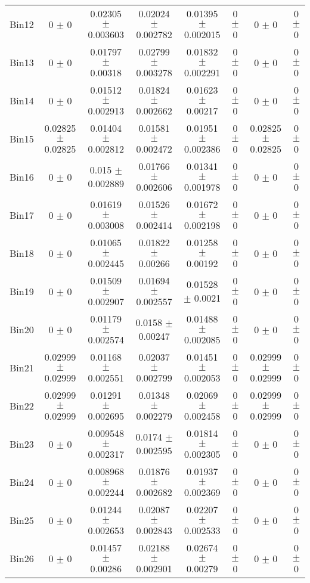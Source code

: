 \begin{tabular}{@{\extracolsep{4pt}}lccccccc@{}}
     Bin12 & 0 $\pm$ 0 & 0.02305 $\pm$ 0.003603 & 0.02024 $\pm$ 0.002782 & 0.01395 $\pm$ 0.002015 & 0 $\pm$ 0 & 0 $\pm$ 0 & 0 $\pm$ 0 \\ 
     Bin13 & 0 $\pm$ 0 & 0.01797 $\pm$ 0.00318 & 0.02799 $\pm$ 0.003278 & 0.01832 $\pm$ 0.002291 & 0 $\pm$ 0 & 0 $\pm$ 0 & 0 $\pm$ 0 \\ 
     Bin14 & 0 $\pm$ 0 & 0.01512 $\pm$ 0.002913 & 0.01824 $\pm$ 0.002662 & 0.01623 $\pm$ 0.00217 & 0 $\pm$ 0 & 0 $\pm$ 0 & 0 $\pm$ 0 \\ 
     Bin15 & 0.02825 $\pm$ 0.02825 & 0.01404 $\pm$ 0.002812 & 0.01581 $\pm$ 0.002472 & 0.01951 $\pm$ 0.002386 & 0 $\pm$ 0 & 0.02825 $\pm$ 0.02825 & 0 $\pm$ 0 \\ 
     Bin16 & 0 $\pm$ 0 & 0.015 $\pm$ 0.002889 & 0.01766 $\pm$ 0.002606 & 0.01341 $\pm$ 0.001978 & 0 $\pm$ 0 & 0 $\pm$ 0 & 0 $\pm$ 0 \\ 
     Bin17 & 0 $\pm$ 0 & 0.01619 $\pm$ 0.003008 & 0.01526 $\pm$ 0.002414 & 0.01672 $\pm$ 0.002198 & 0 $\pm$ 0 & 0 $\pm$ 0 & 0 $\pm$ 0 \\ 
     Bin18 & 0 $\pm$ 0 & 0.01065 $\pm$ 0.002445 & 0.01822 $\pm$ 0.00266 & 0.01258 $\pm$ 0.00192 & 0 $\pm$ 0 & 0 $\pm$ 0 & 0 $\pm$ 0 \\ 
     Bin19 & 0 $\pm$ 0 & 0.01509 $\pm$ 0.002907 & 0.01694 $\pm$ 0.002557 & 0.01528 $\pm$ 0.0021 & 0 $\pm$ 0 & 0 $\pm$ 0 & 0 $\pm$ 0 \\ 
     Bin20 & 0 $\pm$ 0 & 0.01179 $\pm$ 0.002574 & 0.0158 $\pm$ 0.00247 & 0.01488 $\pm$ 0.002085 & 0 $\pm$ 0 & 0 $\pm$ 0 & 0 $\pm$ 0 \\ 
     Bin21 & 0.02999 $\pm$ 0.02999 & 0.01168 $\pm$ 0.002551 & 0.02037 $\pm$ 0.002799 & 0.01451 $\pm$ 0.002053 & 0 $\pm$ 0 & 0.02999 $\pm$ 0.02999 & 0 $\pm$ 0 \\ 
     Bin22 & 0.02999 $\pm$ 0.02999 & 0.01291 $\pm$ 0.002695 & 0.01348 $\pm$ 0.002279 & 0.02069 $\pm$ 0.002458 & 0 $\pm$ 0 & 0.02999 $\pm$ 0.02999 & 0 $\pm$ 0 \\ 
     Bin23 & 0 $\pm$ 0 & 0.009548 $\pm$ 0.002317 & 0.0174 $\pm$ 0.002595 & 0.01814 $\pm$ 0.002305 & 0 $\pm$ 0 & 0 $\pm$ 0 & 0 $\pm$ 0 \\ 
     Bin24 & 0 $\pm$ 0 & 0.008968 $\pm$ 0.002244 & 0.01876 $\pm$ 0.002682 & 0.01937 $\pm$ 0.002369 & 0 $\pm$ 0 & 0 $\pm$ 0 & 0 $\pm$ 0 \\ 
     Bin25 & 0 $\pm$ 0 & 0.01244 $\pm$ 0.002653 & 0.02087 $\pm$ 0.002843 & 0.02207 $\pm$ 0.002533 & 0 $\pm$ 0 & 0 $\pm$ 0 & 0 $\pm$ 0 \\ 
     Bin26 & 0 $\pm$ 0 & 0.01457 $\pm$ 0.00286 & 0.02188 $\pm$ 0.002901 & 0.02674 $\pm$ 0.00279 & 0 $\pm$ 0 & 0 $\pm$ 0 & 0 $\pm$ 0 \\ 

\end{tabular}
